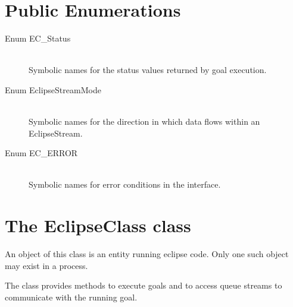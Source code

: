 \section{Public Enumerations}
\begin{description}

\item[Enum EC_Status]\ \\
	Symbolic names for the status values returned by goal execution.

\item[Enum EclipseStreamMode]\ \\
	Symbolic names for the direction in which data flows within
	an EclipseStream.

\item[Enum EC_ERROR]\ \\
	Symbolic names for error conditions in the interface.

\end{description}

\section{The EclipseClass class}
An object of this class is an entity running eclipse code. Only
one such object may exist in a process.

The class provides methods to execute goals and to access queue streams
to communicate with the running goal.

